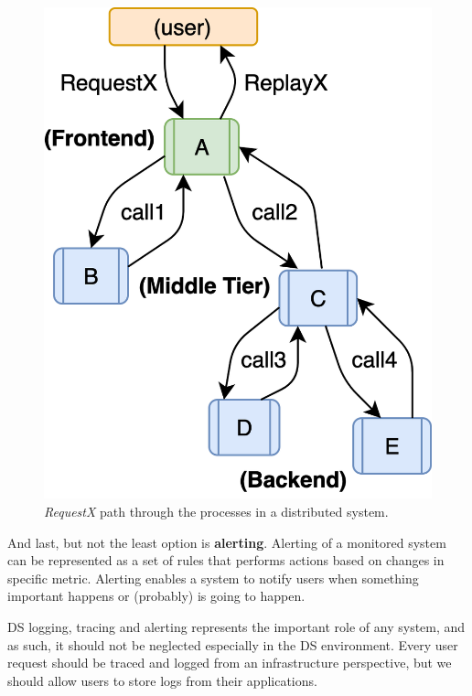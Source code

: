 \begin{figure}[H]
	\begin{center}
		\includegraphics[scale=1]{images/Figure18}
	\end{center}
	\vspace{-0.9cm}
	\caption{\textit{RequestX} path through the processes in a distributed system.}
	\label{fig:fig18}
\end{figure}

\noindent
And last, but not the least option is \textbf{alerting}. Alerting of a monitored system can be represented as a set of rules that performs actions based on changes in specific metric. Alerting enables a system to notify users when something important happens or (probably) is going to happen.

DS logging, tracing and alerting represents the important role of any system, and as such, it should not be neglected especially in the DS environment. Every user request should be traced and logged from an infrastructure perspective, but we should allow users to store logs from their applications.
%
%
